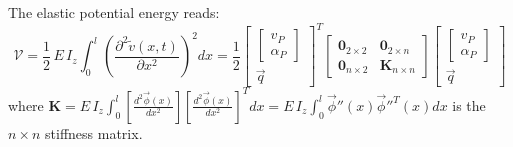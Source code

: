 The elastic potential energy reads:
\[ \mathcal{V}= \frac{1}{2}\,E\,I_z\int_0^l\left(\frac{\partial^2 \widetilde{v}(x,t)}{\partial x^2}\right)^2dx=\frac{1}{2}\left[\begin{array}{c}\left[\begin{array}{c}v_P\\ \alpha_P\end{array}\right] \\ \vec{q} \end{array}\right]^T\left[\begin{array}{cc}\mathbf{0}_{2\times 2} &  \mathbf{0}_{2\times n}\\ \mathbf{0}_{n\times 2} & \mathbf{K}_{n\times n} \end{array}\right]\left[\begin{array}{c} \left[\begin{array}{c} v_P\\ \alpha_P\end{array}\right]\\ \vec{q} \end{array}\right]\]
where $\mathbf{K}=E\,I_z\int_0^l\left[\frac{d^2\vec{\phi}(x)}{dx^2}\right]\left[\frac{d^2\vec{\phi}(x)}{dx^2}\right]^Tdx=E\,I_z\int_0^l\vec{\phi}''(x)\vec{\phi}''^T(x)dx$ is the $n\times n$ stiffness matrix.

